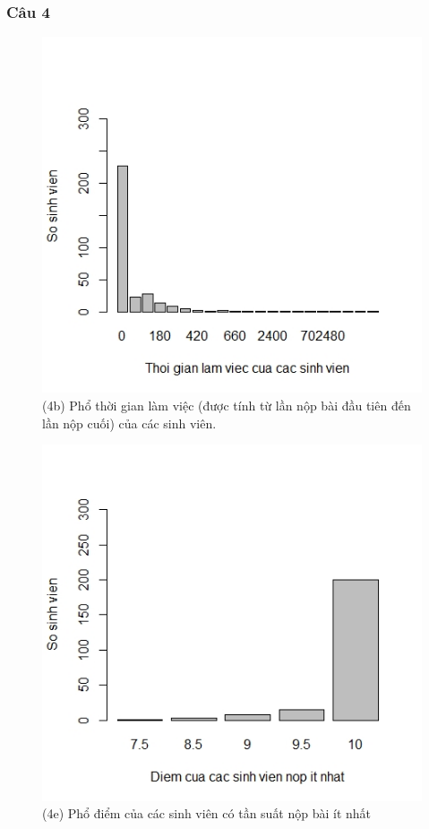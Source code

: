 \documentclass[a4paper]{article}
\theoremstyle{definition}
\begin{document}
\subsubsection{Câu 4}
\begin{figure}[!ht]
    \centering
    \includegraphics[scale=0.4]{Pics/q4b-file1.jpeg}
    \caption{(4b) Phổ thời gian làm việc (được tính từ lần nộp bài đầu tiên đến lần nộp cuối) của các
sinh viên.}
    \label{fig:my_label}
\end{figure}
\newpage
\begin{figure}[!ht]
    \centering
    \includegraphics[scale=0.4]{Pics/q4e-file1.jpeg}
    \caption{(4e) Phổ điểm của các sinh viên có tần suất nộp bài ít nhất}
    \label{fig:my_label}
\end{figure}
\end{document}
